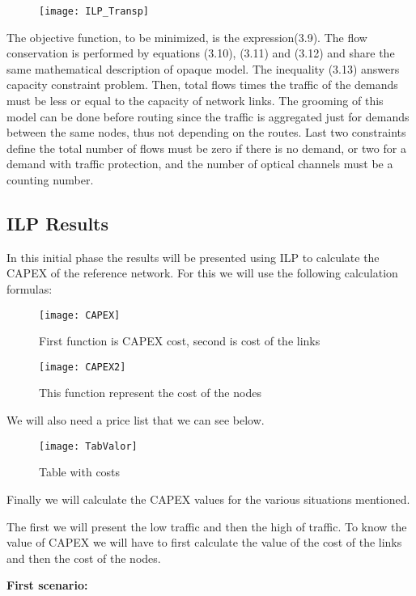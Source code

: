 \begin{figure}[h!]
  \centering
  \texttt{[image: ILP\_Transp]}
\end{figure}

The objective function, to be minimized, is the expression(3.9). The flow conservation is performed by equations (3.10), (3.11) and (3.12) and share the same mathematical description of opaque model. The inequality (3.13) answers capacity constraint problem. Then, total flows times the traffic of the demands must be less or equal to the capacity of network links. The grooming of this model can be done before routing since the traffic is aggregated just for demands between the same nodes, thus not depending on the routes. Last two constraints define the total number of flows must be zero if there is no demand, or two for a demand with traffic protection, and the number of optical channels must be a counting number.

\subsection{ILP Results}
In this initial phase the results will be presented using ILP to calculate the CAPEX of the reference network.
For this we will use the following calculation formulas:

\begin{figure}[h!]
  \centering
  \texttt{[image: CAPEX]}
  \caption{First function is CAPEX cost, second is cost of the links}
\end{figure}

\begin{figure}[h!]
  \centering
  \texttt{[image: CAPEX2]}
  \caption{This function represent the cost of the nodes}
\end{figure}

We will also need a price list that we can see below.

\begin{figure}[h!]
  \centering
  \texttt{[image: TabValor]}
  \caption{Table with costs}
\end{figure}

Finally we will calculate the CAPEX values for the various situations mentioned.

The first we will present the low traffic and then the high of traffic.
To know the value of CAPEX we will have to first calculate the value of the cost of the links and then the cost of the nodes.

\textbf{First scenario:}

